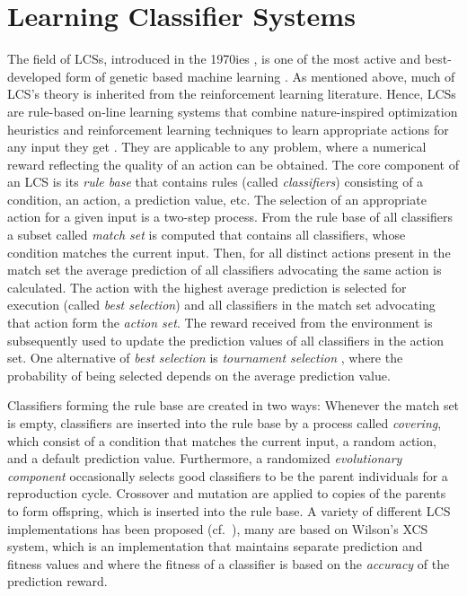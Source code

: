 \section{Learning Classifier Systems}
\label{section:learning-classifier-systems}

The field of LCSs, introduced in the 1970ies \cite{Hol75,Hol76,HR78}, is one of the most active and best-developed form of genetic based machine learning \cite{Kov02a,KL00,Lan08}. As mentioned above, much of LCS's theory is inherited from the reinforcement learning literature. %
Hence, LCSs are rule-based on-line learning systems that combine nature-inspired optimization heuristics and reinforcement learning techniques to learn appropriate actions for any input they get \cite{Wil95}. They are applicable to any problem, where a numerical reward reflecting the quality of an action can be obtained. The core component of an LCS is its \emph{rule base} that contains rules (called \emph{classifiers}) consisting of a condition, an action, a prediction value, etc. The selection of an appropriate action for a given input is a two-step process. From the rule base of all classifiers a subset called \emph{match set} is computed that contains all classifiers, whose condition matches the current input. Then, for all distinct actions present in the match set the average prediction of all classifiers advocating the same action is calculated. The action with the highest average prediction is selected for execution (called \emph{best selection}) and all classifiers in the match set advocating that action form the \emph{action set}. The reward received from the environment is subsequently used to update the prediction values of all classifiers in the action set. One alternative of \emph{best selection} is \emph{tournament selection} \cite{Butz2003}, %
where the probability of being selected depends on the average prediction value.

Classifiers forming the rule base are created in two ways: Whenever the match set is empty, classifiers are inserted into the rule base by a process called \emph{covering}, which consist of a condition that matches the current input, a random action, and a default prediction value. Furthermore, a randomized \emph{evolutionary component} occasionally selects %
good classifiers to be the parent individuals for a reproduction cycle. Crossover and mutation are applied to copies of the parents to form offspring, which is inserted into the rule base. A variety of different LCS implementations has been proposed (cf.~\cite{Kov02a}), many are based on Wilson's XCS \cite{Wil95} system, which is an implementation that maintains separate prediction and fitness values and where the fitness of a classifier is based on the \emph{accuracy} of the prediction reward.  

